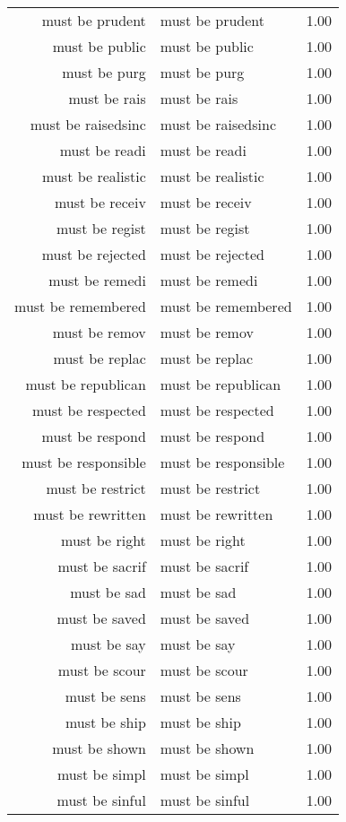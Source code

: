 \begin{table}[ht]
\begin{tabular}{rlr}
  must be prudent & must be prudent & 1.00 \\ 
  must be public & must be public & 1.00 \\ 
  must be purg & must be purg & 1.00 \\ 
  must be rais & must be rais & 1.00 \\ 
  must be raisedsinc & must be raisedsinc & 1.00 \\ 
  must be readi & must be readi & 1.00 \\ 
  must be realistic & must be realistic & 1.00 \\ 
  must be receiv & must be receiv & 1.00 \\ 
  must be regist & must be regist & 1.00 \\ 
  must be rejected & must be rejected & 1.00 \\ 
  must be remedi & must be remedi & 1.00 \\ 
  must be remembered & must be remembered & 1.00 \\ 
  must be remov & must be remov & 1.00 \\ 
  must be replac & must be replac & 1.00 \\ 
  must be republican & must be republican & 1.00 \\ 
  must be respected & must be respected & 1.00 \\ 
  must be respond & must be respond & 1.00 \\ 
  must be responsible & must be responsible & 1.00 \\ 
  must be restrict & must be restrict & 1.00 \\ 
  must be rewritten & must be rewritten & 1.00 \\ 
  must be right & must be right & 1.00 \\ 
  must be sacrif & must be sacrif & 1.00 \\ 
  must be sad & must be sad & 1.00 \\ 
  must be saved & must be saved & 1.00 \\ 
  must be say & must be say & 1.00 \\ 
  must be scour & must be scour & 1.00 \\ 
  must be sens & must be sens & 1.00 \\ 
  must be ship & must be ship & 1.00 \\ 
  must be shown & must be shown & 1.00 \\ 
  must be simpl & must be simpl & 1.00 \\ 
  must be sinful & must be sinful & 1.00 \\ 

\end{tabular}
\end{table}
